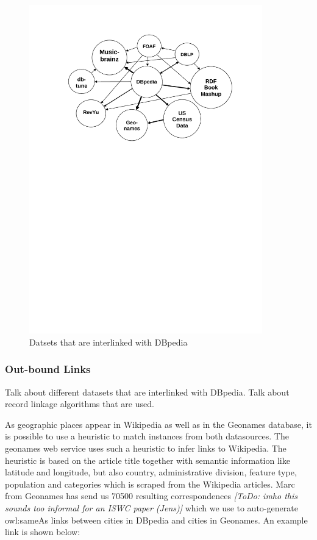 \documentclass{llncs}
\newcommand{\todo}[1]{\emph{[ToDo: #1]}}
\begin{document}
\begin{figure}[h]
	\centering
		\includegraphics[width=0.90\textwidth]{Firgure1.pdf}
	\caption{Datsets that are interlinked with DBpedia}
	\label{fig:Firgure1}
\end{figure}

\subsubsection{Out-bound Links}

Talk about different datasets that are interlinked with DBpedia. Talk about record linkage
algorithms that are used.

As geographic places appear in Wikipedia as well as in the Geonames database, it is possible to use a heuristic to match instances from both datasources. The geonames web service uses such a heuristic to infer links to Wikipedia. The heuristic is based on the article title together with semantic information like latitude and longitude, but also country, administrative division, feature type, population and categories which is scraped from the Wikipedia articles. Marc from Geonames has send us 70500 resulting correspondences \todo{imho this sounds too informal for an ISWC paper (Jens)} which we use to auto-generate owl:sameAs links between cities in DBpedia and cities in Geonames. An example link is shown below: 
\end{document}

